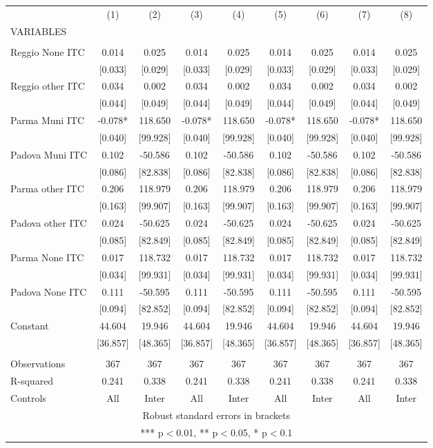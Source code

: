 \begin{tabular}{lcccccccc} \hline
 & (1) & (2) & (3) & (4) & (5) & (6) & (7) & (8) \\
VARIABLES &  &  &  &  &  &  &  &  \\ \hline
 &  &  &  &  &  &  &  &  \\
Reggio None ITC & 0.014 & 0.025 & 0.014 & 0.025 & 0.014 & 0.025 & 0.014 & 0.025 \\
 & [0.033] & [0.029] & [0.033] & [0.029] & [0.033] & [0.029] & [0.033] & [0.029] \\
Reggio other ITC & 0.034 & 0.002 & 0.034 & 0.002 & 0.034 & 0.002 & 0.034 & 0.002 \\
 & [0.044] & [0.049] & [0.044] & [0.049] & [0.044] & [0.049] & [0.044] & [0.049] \\
Parma Muni ITC & -0.078* & 118.650 & -0.078* & 118.650 & -0.078* & 118.650 & -0.078* & 118.650 \\
 & [0.040] & [99.928] & [0.040] & [99.928] & [0.040] & [99.928] & [0.040] & [99.928] \\
Padova Muni ITC & 0.102 & -50.586 & 0.102 & -50.586 & 0.102 & -50.586 & 0.102 & -50.586 \\
 & [0.086] & [82.838] & [0.086] & [82.838] & [0.086] & [82.838] & [0.086] & [82.838] \\
Parma other ITC & 0.206 & 118.979 & 0.206 & 118.979 & 0.206 & 118.979 & 0.206 & 118.979 \\
 & [0.163] & [99.907] & [0.163] & [99.907] & [0.163] & [99.907] & [0.163] & [99.907] \\
Padova other ITC & 0.024 & -50.625 & 0.024 & -50.625 & 0.024 & -50.625 & 0.024 & -50.625 \\
 & [0.085] & [82.849] & [0.085] & [82.849] & [0.085] & [82.849] & [0.085] & [82.849] \\
Parma None ITC & 0.017 & 118.732 & 0.017 & 118.732 & 0.017 & 118.732 & 0.017 & 118.732 \\
 & [0.034] & [99.931] & [0.034] & [99.931] & [0.034] & [99.931] & [0.034] & [99.931] \\
Padova None ITC & 0.111 & -50.595 & 0.111 & -50.595 & 0.111 & -50.595 & 0.111 & -50.595 \\
 & [0.094] & [82.852] & [0.094] & [82.852] & [0.094] & [82.852] & [0.094] & [82.852] \\
Constant & 44.604 & 19.946 & 44.604 & 19.946 & 44.604 & 19.946 & 44.604 & 19.946 \\
 & [36.857] & [48.365] & [36.857] & [48.365] & [36.857] & [48.365] & [36.857] & [48.365] \\
 &  &  &  &  &  &  &  &  \\
Observations & 367 & 367 & 367 & 367 & 367 & 367 & 367 & 367 \\
R-squared & 0.241 & 0.338 & 0.241 & 0.338 & 0.241 & 0.338 & 0.241 & 0.338 \\
 Controls & All & Inter & All & Inter & All & Inter & All & Inter \\ \hline
\multicolumn{9}{c}{ Robust standard errors in brackets} \\
\multicolumn{9}{c}{ *** p$<$0.01, ** p$<$0.05, * p$<$0.1} \\
\end{tabular}
